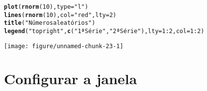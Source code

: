 \documentclass{article}\usepackage[]{graphicx}\usepackage[]{color}
\makeatletter
\def\maxwidth{ %
  \ifdim\Gin@nat@width>\linewidth
    \linewidth
  \else
    \Gin@nat@width
  \fi
}
\newcommand{\hlnum}[1]{\textcolor[rgb]{0.686,0.059,0.569}{#1}}%
\newcommand{\hlstr}[1]{\textcolor[rgb]{0.192,0.494,0.8}{#1}}%
\newcommand{\hlopt}[1]{\textcolor[rgb]{0,0,0}{#1}}%
\newcommand{\hlstd}[1]{\textcolor[rgb]{0.345,0.345,0.345}{#1}}%
\newcommand{\hlkwc}[1]{\textcolor[rgb]{0.333,0.667,0.333}{#1}}%
\newcommand{\hlkwd}[1]{\textcolor[rgb]{0.737,0.353,0.396}{\textbf{#1}}}%
\newenvironment{kframe}{%
 \def\at@end@of@kframe{}%
 \ifinner\ifhmode%
  \def\at@end@of@kframe{\end{minipage}}%
  \begin{minipage}{\columnwidth}%
 \fi\fi%
 \def\FrameCommand##1{\hskip\@totalleftmargin \hskip-\fboxsep
 \colorbox{shadecolor}{##1}\hskip-\fboxsep
     \hskip-\linewidth \hskip-\@totalleftmargin \hskip\columnwidth}%
 \MakeFramed {\advance\hsize-\width
   \@totalleftmargin\z@ \linewidth\hsize
   \@setminipage}}%
 {\par\unskip\endMakeFramed%
 \at@end@of@kframe}
\newenvironment{knitrout}{}{} %
\newcounter{graph}[section]
\makeatother
\begin{document}
\begin{knitrout}
\color{fgcolor}\begin{kframe}
\begin{alltt}
\hlkwd{plot}\hlstd{(}\hlkwd{rnorm}\hlstd{(}\hlnum{10}\hlstd{),} \hlkwc{type} \hlstd{=} \hlstr{"l"}\hlstd{)}
\hlkwd{lines}\hlstd{(}\hlkwd{rnorm}\hlstd{(}\hlnum{10}\hlstd{),} \hlkwc{col} \hlstd{=} \hlstr{"red"}\hlstd{,} \hlkwc{lty} \hlstd{=} \hlnum{2}\hlstd{)}
\hlkwd{title}\hlstd{(}\hlstr{"Números aleatórios"}\hlstd{)}
\hlkwd{legend}\hlstd{(}\hlstr{"topright"}\hlstd{,} \hlkwd{c}\hlstd{(}\hlstr{"1ª Série"}\hlstd{,} \hlstr{"2ª Série"}\hlstd{),} \hlkwc{lty} \hlstd{=} \hlnum{1}\hlopt{:}\hlnum{2}\hlstd{,} \hlkwc{col} \hlstd{=} \hlnum{1}\hlopt{:}\hlnum{2}\hlstd{)}
\end{alltt}
\end{kframe}
\texttt{[image: figure/unnamed-chunk-23-1]} 

\end{knitrout}
\pagebreak
\section{Configurar a janela}
\end{document}
